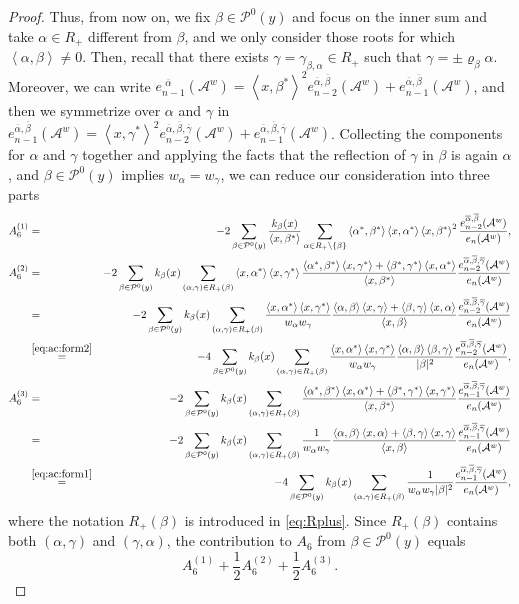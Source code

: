 \documentclass{article}
\numberwithin{equation}{section}
\newcommand{\Aa}{\mathcal{A}^{w}}
\newcommand{\xa}{\left<x,\alpha\right>}
\newcommand{\xb}{\left<x,\beta\right>}
\newcommand{\xc}{\left<x,\gamma\right>}
\newcommand{\xas}{\left<x,\alpha^*\right>}
\newcommand{\xbs}{\left<x,\beta^*\right>}
\newcommand{\xcs}{\left<x,\gamma^*\right>}
\newcommand{\aR}{\alpha\in R_+}
\newcommand{\SaRnb}{\sum_{\aR\backslash\{\beta\}}}
\newcommand{\ab}{\left<\alpha,\beta\right>}
\newcommand{\bc}{\left<\beta,\gamma\right>}
\newcommand{\abs}{\left<\alpha^*,\beta^*\right>}
\newcommand{\bcs}{\left<\beta^*,\gamma^*\right>}
\newcommand{\reflect}[1]{\varrho_{#1}}
\newcommand{\shift}{\,\,}
\newcommand{\eA}[1]{e_{#1}(\Aa)}
\newcommand{\eaA}[1]{e_{#1}^{\shift\overline{\alpha}}(\Aa)}
\newcommand{\eabA}[1]{e_{#1}^{\overline{\alpha}, \overline{\beta}}(\Aa)}
\newcommand{\eabcA}[1]{e_{#1}^{\overline{\alpha}, \overline{\beta}, \overline{\gamma}}(\Aa)}
\newcommand{\Pzero}{\mathcal{P}^0(y)}
\theoremstyle{plain}
\begin{document}
\begin{proof}
 Thus, from now on, we fix $\beta\in \Pzero$ and focus on the inner sum and take $\alpha\in R_+$ different from $\beta$, and we only consider those roots for which $\ab\neq 0$. Then, recall that there exists $\gamma = \gamma_{\beta,\alpha}\in R_+$ such that $\gamma=\pm\reflect{\beta}\alpha$.
 Moreover, we can write $\eaA{n-1} = \xbs^2\eabA{n-2}+\eabA{n-1}$, and then we symmetrize over $\alpha$ and $\gamma$ in $\eabA{n-1} = \xcs^2\eabcA{n-2}+\eabcA{n-1}$. Collecting the components for $\alpha$ and $\gamma$ together and applying the facts that the reflection of $\gamma$ in $\beta$ is again $\alpha$, and $\beta\in\Pzero$ implies $w_\alpha=w_\gamma$, we can reduce our consideration into three parts
 \begin{eqnarray*}
     A_6^{(1)} &=& -2\sum_{\beta\in \Pzero}\frac{k_\beta(x)}{\xbs}\SaRnb\abs \xas\xbs^2 \frac{\eabA{n-2}}{\eA{n}}\/,\\
     A_6^{(2)} &=&-2\sum_{\beta\in \Pzero}k_\beta(x) \sum_{(\alpha,\gamma)\in R_+(\beta)}\xas\xcs\frac{\abs\xcs+\bcs\xas}{\xbs} \frac{\eabcA{n-2}}{\eA{n}}\\
      &=& -2\sum_{\beta\in \Pzero}k_\beta(x) \sum_{(\alpha,\gamma)\in R_+(\beta)}\frac{\xas\xcs}{w_\alpha w_\gamma}\frac{\ab\xc+\bc\xa}{\xb} \frac{\eabcA{n-2}}{\eA{n}}\\
      &\stackrel{\eqref{eq:ac:form2}}{=}& -4\sum_{\beta\in \Pzero}k_\beta(x) \sum_{(\alpha,\gamma)\in R_+(\beta)}\frac{\xas\xcs}{w_\alpha w_\gamma}\frac{\ab\bc}{|\beta|^2} \frac{\eabcA{n-2}}{\eA{n}}\/,\\
     A_6^{(3)} &=&-2\sum_{\beta\in \Pzero}k_\beta(x) \sum_{(\alpha,\gamma)\in R_+(\beta)}\frac{\abs\xas+\bcs\xcs}{\xbs} \frac{\eabcA{n-1}}{\eA{n}}\\
     &=&-2\sum_{\beta\in \Pzero}k_\beta(x) \sum_{(\alpha,\gamma)\in R_+(\beta)}\frac{1}{w_\alpha w_\gamma}\frac{\ab\xa+\bc\xc}{\xb} \frac{\eabcA{n-1}}{\eA{n}}\\
     &\stackrel{\eqref{eq:ac:form1}}{=}&-4\sum_{\beta\in \Pzero}k_\beta(x) \sum_{(\alpha,\gamma)\in R_+(\beta)}\frac{1}{w_\alpha w_\gamma |\beta|^2}\frac{\eabcA{n-1}}{\eA{n}}\/,
 \end{eqnarray*}
 where the notation $R_+(\beta)$ is introduced in \eqref{eq:Rplus}.
Since $R_+(\beta)$ contains both $(\alpha,\gamma)$ and
$(\gamma,\alpha)$, the contribution to $A_6$ from
$\beta\in\Pzero$ equals
\begin{equation*}
    A_6^{(1)}+\frac12 A_6^{(2)}+\frac12 A_6^{(3)}.
\end{equation*}
 

\end{proof}
\end{document}
